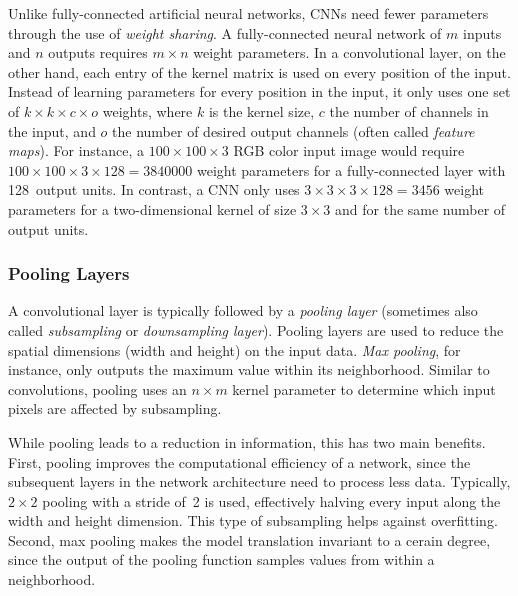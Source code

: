 Unlike fully-connected artificial neural networks, CNNs need fewer parameters through the use of \emph{weight sharing}. A fully-connected neural network of $m$ inputs and $n$ outputs requires $m \times n$ weight parameters. In a convolutional layer, on the other hand, each entry of the kernel matrix is used on every position of the input. Instead of learning parameters for every position in the input, it only uses one set of $k \times k \times c \times o$ weights, where $k$ is the kernel size, $c$ the number of channels in the input, and $o$ the number of desired output channels (often called \emph{feature maps}). For instance, a $100 \times 100 \times 3$ RGB color input image would require $100 \times 100 \times 3 \times 128 = \num{3840000}$ weight parameters for a fully-connected layer with \num{128}~output units. In contrast, a CNN only uses $3 \times 3 \times 3 \times 128 = \num{3456}$ weight parameters for a two-dimensional kernel of size $3 \times 3$ and for the same number of output units.


\subsubsection{Pooling Layers}
A convolutional layer is typically followed by a \emph{pooling layer} (sometimes also called \emph{subsampling} or \emph{downsampling layer}). Pooling layers are used to reduce the spatial dimensions (width and height) on the input data. \emph{Max pooling}, for instance, only outputs the maximum value within its neighborhood. Similar to convolutions, pooling uses an $n \times m$ kernel parameter to determine which input pixels are affected by subsampling.

	While pooling leads to a reduction in information, this has two main benefits. First, pooling improves the computational efficiency of a network, since the subsequent layers in the network architecture need to process less data. Typically, $2 \times 2$ pooling with a stride of~\num{2} is used, effectively halving every input along the width and height dimension. This type of subsampling helps against overfitting.
	Second, max pooling makes the model translation invariant to a cerain degree, since the output of the pooling function samples values from within a neighborhood.
	
